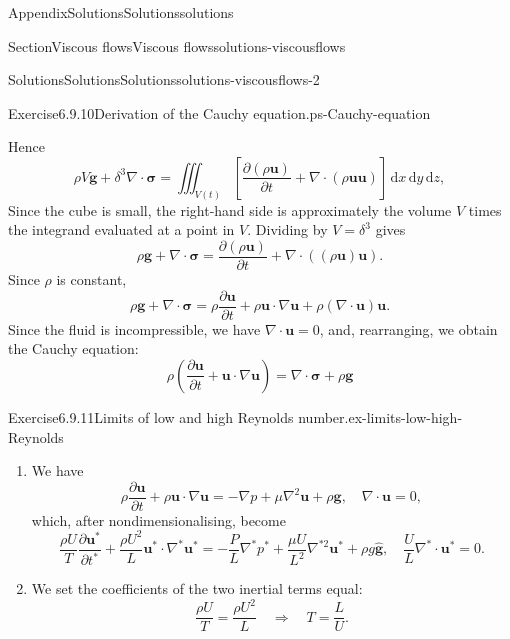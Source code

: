 \documentclass[oneside,10pt,]{book}
\numberwithin{equation}{section}
\newcommand{\de}{\mathrm{d}}
\newcommand{\pd}[2]{\frac{\partial#1}{\partial#2}}
\newcommand{\bu}{\boldsymbol{u}}
\newcommand{\bg}{\boldsymbol{g}}
\newcommand{\bsigma}{\boldsymbol{\sigma}}
\begin{document}
\begin{appendixptx}{Appendix}{Solutions}{}{Solutions}{}{}{solutions}
\begin{sectionptx}{Section}{Viscous flows}{}{Viscous flows}{}{}{solutions-viscousflows}
\begin{solutions-subsection-numberless}{Solutions}{Solutions}{}{Solutions}{}{}{solutions-viscousflows-2}
\begin{divisionsolution}{Exercise}{6.9.10}{Derivation of the Cauchy equation.}{ps-Cauchy-equation}
\begin{enumerate}[font=\bfseries,label=(\alph*),ref=\alph*]
%
\par
Hence%
\begin{equation*}
\rho V\bg+\delta^3\nabla\cdot\bsigma
=\iiint_{V(t)} \left[\pd{(\rho\bu)}{t} + \nabla \cdot (\rho\bu\bu)\right]\,\de{x}\,\de{y}\,\de{z},
\end{equation*}
Since the cube is small, the right-hand side is approximately the volume \(V\) times the integrand evaluated at a point in \(V\). Dividing by \(V=\delta^3\) gives%
\begin{equation*}
\rho\bg+\nabla\cdot\bsigma
=\pd{(\rho\bu)}{t} + \nabla \cdot ((\rho\bu)\bu).
\end{equation*}
Since \(\rho\) is constant,%
\begin{equation*}
\rho\bg+\nabla\cdot\bsigma
=\rho\pd{\bu}{t} + \rho\bu\cdot\nabla\bu+\rho(\nabla\cdot\bu)\bu.
\end{equation*}
Since the fluid is incompressible, we have \(\nabla\cdot\bu=0\), and, rearranging, we obtain the Cauchy equation:%
\begin{equation*}
\rho\left(\pd{\bu}{t} + \bu\cdot\nabla\bu\right)
=\nabla\cdot\bsigma+\rho\bg
\end{equation*}
%
\end{enumerate}%
\end{divisionsolution}%
\begin{divisionsolution}{Exercise}{6.9.11}{Limits of low and high Reynolds number.}{ex-limits-low-high-Reynolds}%
\begin{enumerate}[font=\bfseries,label=(\alph*),ref=\alph*]%
\item[(a)]\noindent\hypertarget{ex-limits-low-high-Reynolds-3-2-main}{}We have%
\begin{equation*}
\rho\pd{\bu}{t}+\rho\bu\cdot\nabla\bu=-\nabla p+\mu\nabla^2\bu+\rho{\bg},\quad
\nabla\cdot\bu=0,
\end{equation*}
which, after nondimensionalising, become%
\begin{equation*}
\frac{\rho U}{T}\pd{\bu^*}{t^*}+\frac{\rho U^2}{L}\bu^*\cdot\nabla^*\bu^*
=-\frac{P}{L}\nabla^* p^*+\frac{\mu U}{L^2}\nabla^{*2}\bu^*+\rho g\hat{\bg},\quad
\frac{U}{L}\nabla^*\cdot\bu^*=0.
\end{equation*}
%
\item[(b)]\noindent\hypertarget{ex-limits-low-high-Reynolds-4-2-main}{}We set the coefficients of the two inertial terms equal:%
\begin{equation*}
\frac{\rho U}{T}=\frac{\rho U^2}{L}
\quad\Rightarrow\quad
T=\frac{L}{U}.
\end{equation*}

\end{enumerate}
\end{divisionsolution}
\end{solutions-subsection-numberless}
\end{sectionptx}
\end{appendixptx}
\end{document}
